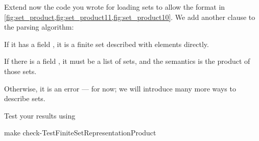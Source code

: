 \begin{codeexercise}
    Extend now the code you wrote for loading sets to allow the format in \cref{fig:set_product,fig:set_product11,fig:set_product10}.
    We add another clause to the parsing algorithm:
    \begin{compactenum}
        \item If it has a field , it is a finite set described with elements directly.
        \item If there is a field , it must be a list of sets, and the semantics is the product of those sets.
        \item Otherwise, it is an error --- for now; we will introduce many more ways to describe sets.
    \end{compactenum}
    Test your results using
    \begin{console}
        make check-TestFiniteSetRepresentationProduct
    \end{console}
\end{codeexercise}
